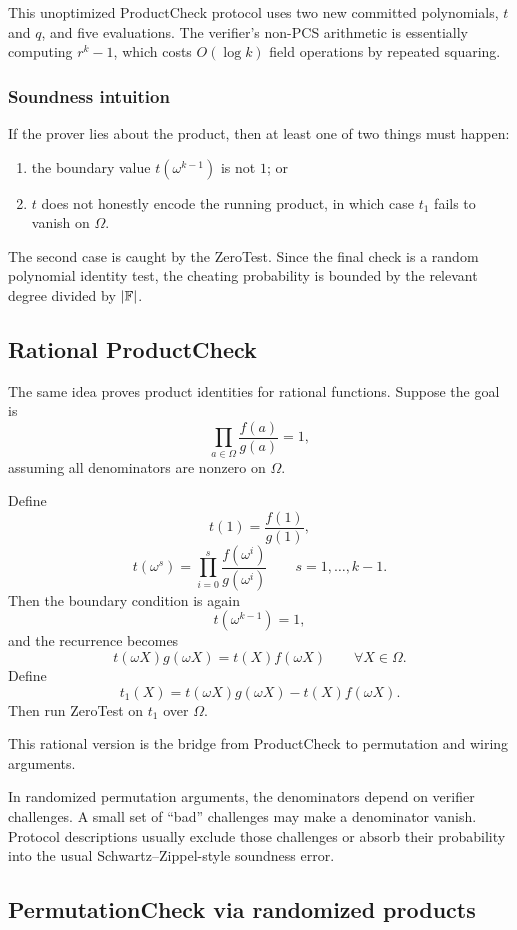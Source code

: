 This unoptimized ProductCheck protocol uses two new committed polynomials, $t$ and $q$, and five evaluations. The verifier's non-PCS arithmetic is essentially computing $r^k-1$, which costs $O(\log k)$ field operations by repeated squaring.

\subsubsection*{Soundness intuition}

If the prover lies about the product, then at least one of two things must happen:
\begin{enumerate}[leftmargin=2em]
    \item the boundary value $t(\omega^{k-1})$ is not $1$; or
    \item $t$ does not honestly encode the running product, in which case $t_1$ fails to vanish on $\Omega$.
\end{enumerate}
The second case is caught by the ZeroTest. Since the final check is a random polynomial identity test, the cheating probability is bounded by the relevant degree divided by $|\mathbb{F}|$.

\subsection{Rational ProductCheck}

The same idea proves product identities for rational functions. Suppose the goal is
\[
    \prod_{a\in\Omega}\frac{f(a)}{g(a)}=1,
\]
assuming all denominators are nonzero on $\Omega$.

Define
\[
    t(1)=\frac{f(1)}{g(1)},
\]
\[
    t(\omega^s)=\prod_{i=0}^{s}\frac{f(\omega^i)}{g(\omega^i)}
    \qquad s=1,\ldots,k-1.
\]
Then the boundary condition is again
\[
    t(\omega^{k-1})=1,
\]
and the recurrence becomes
\[
    t(\omega X)g(\omega X)=t(X)f(\omega X)
    \qquad\forall X\in\Omega.
\]
Define
\[
    t_1(X)=t(\omega X)g(\omega X)-t(X)f(\omega X).
\]
Then run ZeroTest on $t_1$ over $\Omega$.

This rational version is the bridge from ProductCheck to permutation and wiring arguments.

In randomized permutation arguments, the denominators depend on verifier challenges. A small set of ``bad'' challenges may make a denominator vanish. Protocol descriptions usually exclude those challenges or absorb their probability into the usual Schwartz--Zippel-style soundness error.

\subsection{PermutationCheck via randomized products}

